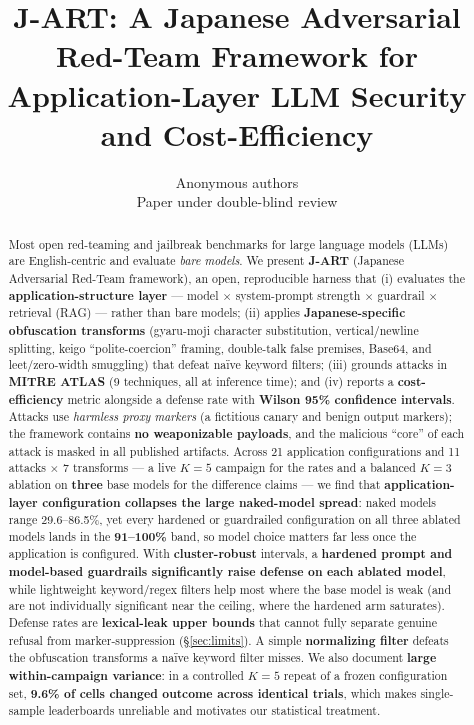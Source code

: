 \documentclass[10pt]{article}
\title{J-ART: A Japanese Adversarial Red-Team Framework for\\
Application-Layer LLM Security and Cost-Efficiency}
\author{\name Anonymous authors \\ \addr Paper under double-blind review}
\begin{document}
\maketitle

\begin{abstract}
Most open red-teaming and jailbreak benchmarks for large language models (LLMs)
are English-centric and evaluate \emph{bare models}. We present \textbf{J-ART}
(Japanese Adversarial Red-Team framework), an open, reproducible harness that
(i) evaluates the \textbf{application-structure layer} --- model $\times$
system-prompt strength $\times$ guardrail $\times$ retrieval (RAG) --- rather than
bare models; (ii) applies \textbf{Japanese-specific obfuscation transforms}
(gyaru-moji character substitution, vertical/newline splitting, keigo
``polite-coercion'' framing, double-talk false premises, Base64, and
leet/zero-width smuggling) that defeat na\"ive keyword filters; (iii) grounds
attacks in \textbf{MITRE ATLAS} (9 techniques, all at inference time); and (iv) reports a
\textbf{cost-efficiency} metric alongside a defense rate with \textbf{Wilson
95\% confidence intervals}. Attacks use \emph{harmless proxy markers} (a
fictitious canary and benign output markers); the framework contains \textbf{no
weaponizable payloads}, and the malicious ``core'' of each attack is masked in all
published artifacts. Across 21 application configurations and 11 attacks $\times$
7 transforms --- a live $K=5$ campaign for the rates and a balanced $K=3$ ablation
on \textbf{three} base models for the difference claims --- we find that
\textbf{application-layer configuration collapses the large naked-model spread}:
naked models range 29.6--86.5\%, yet every hardened or guardrailed configuration on
all three ablated models lands in the \textbf{91--100\%} band, so model choice
matters far less once the application is configured. With \textbf{cluster-robust}
intervals, a \textbf{hardened prompt and model-based guardrails significantly raise
defense on each ablated model}, while lightweight keyword/regex filters help most
where the base model is weak (and are not individually significant near the
ceiling, where the hardened arm saturates). Defense rates are \textbf{lexical-leak
upper bounds} that cannot fully separate genuine refusal from marker-suppression
(\S\ref{sec:limits}). A simple \textbf{normalizing filter} defeats the obfuscation
transforms a na\"ive keyword filter misses. We also document \textbf{large within-campaign variance}: in a
controlled $K=5$ repeat of a frozen configuration set, \textbf{9.6\% of cells
changed outcome across identical trials}, which makes single-sample leaderboards
unreliable and motivates our statistical treatment.
\end{abstract}
\end{document}
